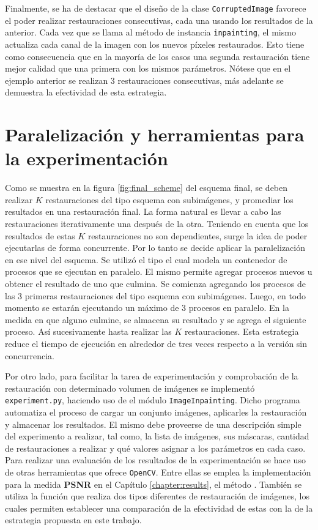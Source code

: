 Finalmente, se ha de destacar que el diseño de la clase \texttt{CorruptedImage} favorece el poder realizar restauraciones consecutivas, cada una usando los resultados de la anterior. Cada vez que se llama al m\'etodo de instancia \texttt{inpainting}, el mismo actualiza cada canal de la imagen con los nuevos p\'ixeles restaurados. Esto tiene como consecuencia que en la mayor\'ia de los casos una segunda restauraci\'on tiene mejor calidad que una primera con los mismos par\'ametros. N\'otese que en el ejemplo anterior se realizan 3 restauraciones consecutivas, m\'as adelante se demuestra la efectividad de esta estrategia.

\section{Paralelizaci\'on y herramientas para la experimentaci\'on}

Como se muestra en la figura \ref{fig:final_scheme} del esquema final, se deben realizar $K$ restauraciones del tipo esquema con subim\'agenes, y promediar los resultados en una restauraci\'on final. La forma natural es llevar a cabo las restauraciones iterativamente una despu\'es de la otra. Teniendo en cuenta que los resultados de estas $K$ restauraciones no son dependientes, surge la idea de poder ejecutarlas de forma concurrente. Por lo tanto se decide aplicar la paralelizaci\'on en ese nivel del esquema. Se utiliz\'o el tipo  el cual modela un contenedor de procesos que se ejecutan en paralelo. El mismo permite agregar procesos nuevos u obtener el resultado de uno que culmina. Se comienza agregando los procesos de las 3 primeras restauraciones del tipo esquema con subim\'agenes. Luego, en todo momento se estar\'an ejecutando un m\'aximo de 3 procesos en paralelo. En la medida en que alguno culmine, se almacena su resultado y se agrega el siguiente proceso. As\'i sucesivamente hasta realizar las $K$ restauraciones. Esta estrategia reduce el tiempo de ejecución en alrededor de tres veces respecto a la versión sin concurrencia.

Por otro lado, para facilitar la tarea de experimentaci\'on y comprobaci\'on de la restauraci\'on con determinado volumen de im\'agenes se implement\'o \texttt{experiment.py}, haciendo uso de el m\'odulo \texttt{ImageInpainting}. Dicho programa automatiza el proceso de cargar un conjunto im\'agenes, aplicarles la restauraci\'on y almacenar los resultados. El mismo debe proveerse de una descripci\'on simple del experimento a realizar, tal como, la lista de im\'agenes, sus m\'ascaras, cantidad de restauraciones a realizar y qu\'e valores asignar a los par\'ametros en cada caso. Para realizar una evaluaci\'on de los resultados de la experimentaci\'on se hace uso de otras herramientas que ofrece \texttt{OpenCV}. Entre ellas se emplea la implementaci\'on para la medida \textbf{PSNR} \cite{enwiki:psnr} en el Cap\'itulo \ref{chapter:results}, el m\'etodo . Tambi\'en se utiliza la funci\'on  que realiza dos tipos diferentes de restauraci\'on de im\'agenes, los cuales permiten establecer una comparación de la efectividad de estas con la de la estrategia  propuesta en este trabajo.